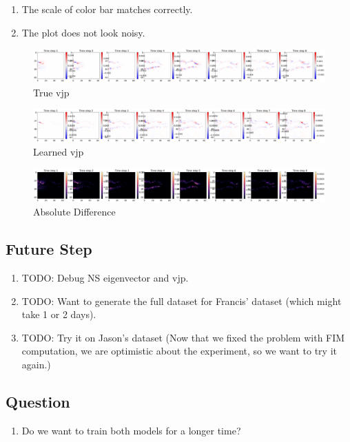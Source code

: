 \documentclass[
]{article}
\providecommand{\tightlist}{%
  \setlength{\itemsep}{0pt}\setlength{\parskip}{0pt}}\usepackage{longtable,booktabs,array}
\begin{document}
\begin{enumerate}
\def\labelenumi{\arabic{enumi}.}
\tightlist
\item
  The scale of color bar matches correctly.
\item
  The plot does not look noisy.
\end{enumerate}

\begin{figure}[H]

{\centering \includegraphics[width=1\textwidth,height=\textheight]{../../plot/GCS_channel_plot/training/JAC/true_vjp_1.png}

}

\caption{True vjp}

\end{figure}%
\begin{figure}[H]

{\centering \includegraphics[width=1\textwidth,height=\textheight]{../../plot/GCS_channel_plot/training/JAC/learned_vjp_990.png}

}

\caption{Learned vjp}

\end{figure}%
\begin{figure}[H]

{\centering \includegraphics[width=1\textwidth,height=\textheight]{../../plot/GCS_channel_plot/training/JAC/diff_vjp_990.png}

}

\caption{Absolute Difference}

\end{figure}%

\subsection{Future Step}\label{future-step}

\begin{enumerate}
\def\labelenumi{\arabic{enumi}.}
\tightlist
\item
  TODO: Debug NS eigenvector and vjp.
\item
  TODO: Want to generate the full dataset for Francis' dataset (which
  might take 1 or 2 days).
\item
  TODO: Try it on Jason's dataset (Now that we fixed the problem with
  FIM computation, we are optimistic about the experiment, so we want to
  try it again.)
\end{enumerate}

\subsection{Question}\label{question}

\begin{enumerate}
\def\labelenumi{\arabic{enumi}.}
\tightlist
\item
  Do we want to train both models for a longer time?
\end{enumerate}
\end{document}
